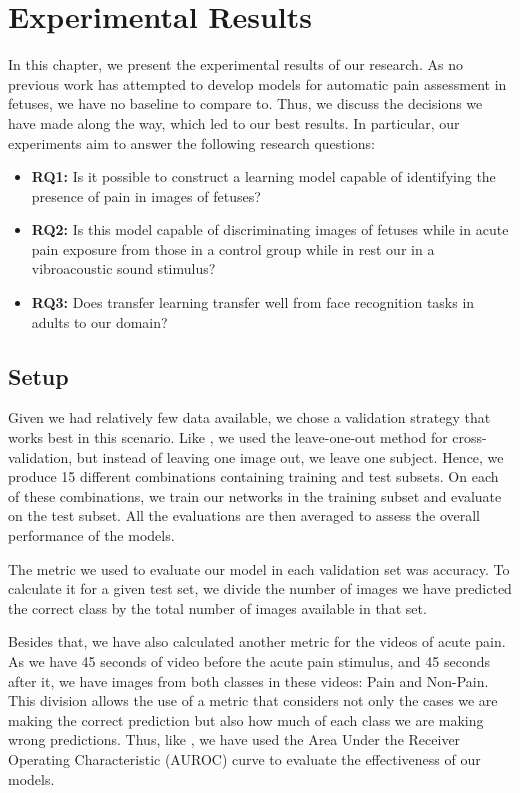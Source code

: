 \chapter{Experimental Results}

In this chapter, we present the experimental results of our research. As no previous work has attempted to develop models for automatic pain assessment in fetuses, we have no baseline to compare to. Thus, we discuss the decisions we have made along the way, which led to our best results. In particular, our experiments aim to answer the following research questions:

\begin{itemize}
    \item \textbf{RQ1:} Is it possible to construct a learning model capable of identifying the presence of pain in images of fetuses?
    
    \item \textbf{RQ2:} Is this model capable of discriminating images of fetuses while in acute pain exposure from those in a control group while in rest our in a vibroacoustic sound stimulus?
    
    \item \textbf{RQ3:} Does transfer learning transfer well from face recognition tasks in adults to our domain?
\end{itemize}

\section{Setup}

Given we had relatively few data available, we chose a validation strategy that works best in this scenario. Like \cite{CelonaM17}, we used the leave-one-out method for cross-validation, but instead of leaving one image out, we leave one subject. Hence, we produce 15 different combinations containing training and test subsets. On each of these combinations, we train our networks in the training subset and evaluate on the test subset. All the evaluations are then averaged to assess the overall performance of the models.

The metric we used to evaluate our model in each validation set was accuracy. To calculate it for a given test set, we divide the number of images we have predicted the correct class by the total number of images available in that set.

Besides that, we have also calculated another metric for the videos of acute pain. As we have 45 seconds of video before the acute pain stimulus, and 45 seconds after it, we have images from both classes in these videos: Pain and Non-Pain.  This division allows the use of a metric that considers not only the cases we are making the correct prediction but also how much of each class we are making wrong predictions. Thus, like \cite{abs-1807-01631}, we have used the Area Under the Receiver Operating Characteristic (AUROC) curve to evaluate the effectiveness of our models.

